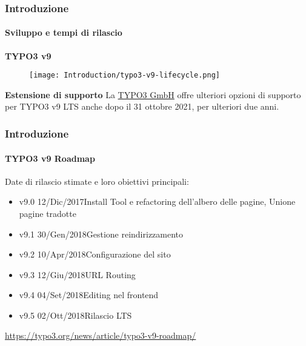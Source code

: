 \begin{frame}[fragile]
	\frametitle{Introduzione}
	\framesubtitle{Sviluppo e tempi di rilascio}

	\textbf{TYPO3 v9}

	\begin{figure}
		\texttt{[image: Introduction/typo3-v9-lifecycle.png]}
	\end{figure}

	\textbf{Estensione di supporto}\newline
	\smaller
		La \href{https://typo3.com}{TYPO3 GmbH} offre ulteriori opzioni di supporto
		per TYPO3 v9 LTS anche dopo il 31 ottobre 2021, per ulteriori due anni.
	\normalsize


\end{frame}

\begin{frame}[fragile]
	\frametitle{Introduzione}
	\framesubtitle{TYPO3 v9 Roadmap}

	Date di rilascio stimate e loro obiettivi principali:

	\begin{itemize}

		\item v9.0 \tabto{1.1cm}12/Dic/2017\tabto{3.4cm}Install Tool e refactoring dell'albero delle pagine,\newline
			\tabto{3.4cm}Unione pagine tradotte
		\item
			\begingroup
				\color{typo3orange}
					v9.1 \tabto{1.1cm}30/Gen/2018\tabto{3.4cm}Gestione reindirizzamento
			\endgroup
		\item v9.2 \tabto{1.1cm}10/Apr/2018\tabto{3.4cm}Configurazione del sito
		\item v9.3 \tabto{1.1cm}12/Giu/2018\tabto{3.4cm}URL Routing
		\item v9.4 \tabto{1.1cm}04/Set/2018\tabto{3.4cm}Editing nel frontend
		\item v9.5 \tabto{1.1cm}02/Ott/2018\tabto{3.4cm}Rilascio LTS

	\end{itemize}

	\smaller
		\url{https://typo3.org/news/article/typo3-v9-roadmap/}
	\normalsize

\end{frame}

